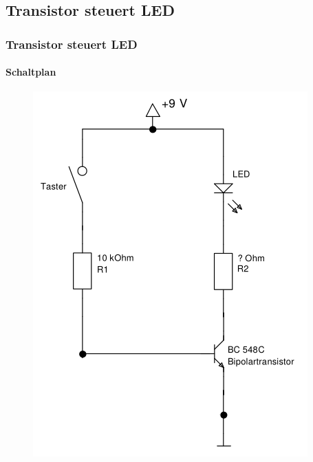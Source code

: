 \subsection{Transistor steuert LED} %
\label{sub:Transistor_steuert_LED}
\begin{frame}
    \frametitle{Transistor steuert LED}
    \framesubtitle{Schaltplan}
    \begin{figure}[H]
    \begin{center}
            \includegraphics[scale=0.35]{./img/schaltungen/transistorLED_1.png}
    \end{center}
    \end{figure}
\end{frame}
